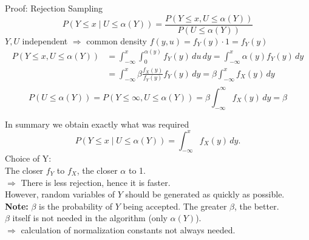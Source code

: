 \documentclass[11pt,compress,t,notes=noshow, xcolor=table]{beamer}
\begin{document}
\begin{vbframe}{Proof: Rejection Sampling}
$$ P(Y\le x \mid U\le \alpha(Y)) = \frac{P(Y\le x, U\le \alpha(Y))}{P(U\le\alpha(Y))}
$$
$Y, U$ independent $\Rightarrow$ common density $f(y,u)=f_Y(y)\cdot 1=f_Y(y)$
\begin{align*}
P(Y\le x, U\le\alpha(Y)) &= \int_{-\infty}^{x}\int_{0}^{\alpha(y)}f_Y(y)\,du\,dy
=\int_{-\infty}^{x}\alpha(y) f_Y(y)\,dy\\
&=\int_{-\infty}^{x}\beta\frac{f_X(y)}{f_Y(y)} f_Y(y)\,dy
=\beta\int_{-\infty}^{x}f_X(y)\,dy\\
\end{align*}
$$P(U\le\alpha(Y)) = P(Y\le\infty,U\le\alpha(Y))
                 = \beta\int_{-\infty}^{\infty}f_X(y)\,dy=\beta
$$

\framebreak

In summary we obtain exactly what was required
$$
P(Y\le x \mid U\le \alpha(Y)) = \int_{-\infty}^{x}f_X(y)\,dy.
$$
Choice of Y:\\
The closer $f_Y$ to $f_X$, the closer $\alpha$ to 1.\\
$\Rightarrow$ There is less rejection, hence it is faster.\\
\medskip
However, random variables of $Y$ should be generated as quickly as possible.\\
\medskip
\textbf{Note:} $\beta$ is the probability of $Y$ being accepted. The greater $\beta$, the better.\\
\medskip
$\beta$ itself is not needed in the algorithm (only $\alpha(Y)$).\\ $\Rightarrow$ calculation of normalization constants not always needed.
\end{vbframe}
\end{document}

